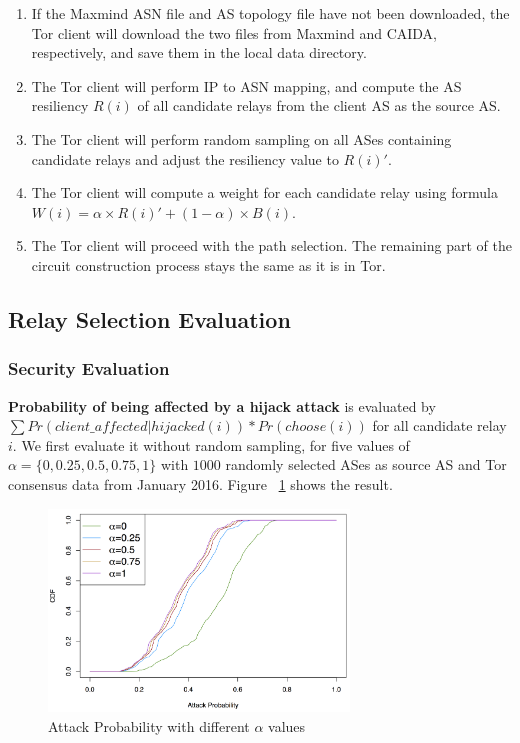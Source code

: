 \begin{enumerate}
\item If the Maxmind ASN file and AS topology file have not been downloaded, the Tor client will download the two files from Maxmind and CAIDA, respectively, and save them in the local data directory. 
\item The Tor client will perform IP to ASN mapping, and compute the AS resiliency $R(i)$ of all candidate relays from the client AS as the source AS. 
\item The Tor client will perform random sampling on all ASes containing candidate relays and adjust the resiliency value to $R(i)\prime$.
\item The Tor client will compute a weight for each candidate relay using formula $W(i) = \alpha \times R(i) \prime + (1 - \alpha) \times B(i)$. 
\item The Tor client will proceed with the path selection. The remaining part of the circuit construction process stays the same as it is in Tor. 
\end{enumerate}

\subsection{Relay Selection Evaluation}

\subsubsection{Security Evaluation}

\textbf{Probability of being affected by a hijack attack} is evaluated by
 $\sum Pr(client\_affected | hijacked(i)) * Pr(choose(i))$ for all candidate relay $i$. We first evaluate it without random sampling, for five values of $\alpha=\{0, 0.25, 0.5, 0.75, 1\}$ with $1000$ randomly selected ASes as source AS and Tor consensus data from January 2016. Figure ~\ref{fig_attack} shows the result. 

\begin{figure}[ht!]
\centering
\includegraphics[width=80mm]{figure/attack}
\caption{Attack Probability with different $\alpha$ values \label{fig_attack}}
\end{figure}

